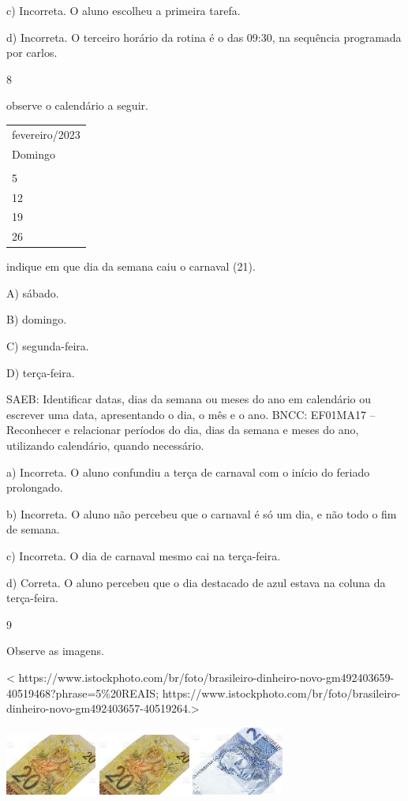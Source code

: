 c) Incorreta. O aluno escolheu a primeira tarefa.

d) Incorreta. O terceiro horário da rotina é o das 09:30, na sequência programada por carlos.

\num{8}

observe o calendário a seguir.

\begin{longtable}[]{@{}l@{}}
\toprule
fevereiro/2023\tabularnewline
Domingo\tabularnewline
\tabularnewline
5\tabularnewline
12\tabularnewline
19\tabularnewline
26\tabularnewline
\bottomrule
\end{longtable}

indique em que dia da semana caiu o carnaval (21).

A) sábado.

B) domingo.

C) segunda-feira.

D) terça-feira.

SAEB: Identificar datas, dias da semana ou meses do ano em
calendário ou escrever uma data, apresentando o dia, o mês e o ano.
BNCC: EF01MA17 -- Reconhecer e relacionar períodos do dia, dias da semana
e meses do ano, utilizando calendário, quando necessário.

a) Incorreta. O aluno confundiu a terça de carnaval com o início do feriado prolongado.

b) Incorreta. O aluno não percebeu que o carnaval é só um dia, e não todo
o fim de semana.

c) Incorreta. O dia de carnaval mesmo cai na terça-feira.

d) Correta. O aluno percebeu que o dia destacado de azul estava na coluna da terça-feira.

\num{9}

Observe as imagens.

\textless{}
https://www.istockphoto.com/br/foto/brasileiro-dinheiro-novo-gm492403659-40519468?phrase=5\%20REAIS;
https://www.istockphoto.com/br/foto/brasileiro-dinheiro-novo-gm492403657-40519264.\textgreater{}

\includegraphics[width=1.18253in,height=0.78643in]{media/image108.jpg}
\includegraphics[width=1.18253in,height=0.78643in]{media/image108.jpg}
\includegraphics[width=1.18253in,height=0.88690in]{media/image109.jpg}

